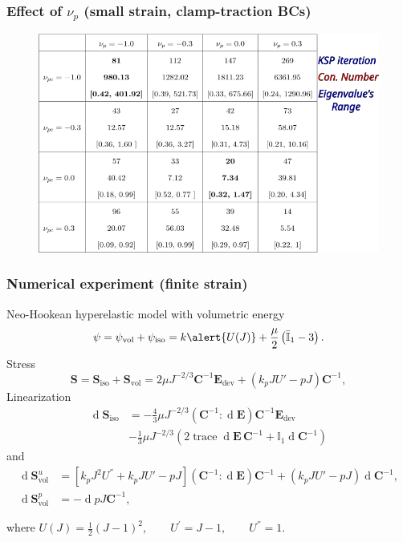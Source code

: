 \documentclass{beamer}
\newcommand{\bm}{\boldsymbol}
\newcommand\bS{\bm S}
\newcommand\bC{\bm C}
\newcommand\bE{\bm E}
\newcommand\bulk{k}
\newcommand\tcolon{\!:\!}
\newcommand\trace{\operatorname{trace}}
\newcommand\diff{\operatorname{d}\!}
\begin{document}
\begin{frame}
	\frametitle{Effect of $\nu_p$ (small strain, clamp-traction BCs)}
	\begin{figure} [h]
		\includegraphics[width=1\textwidth]{../figs/blockpc-mixed-linear-bending.png}
	\end{figure}
\end{frame}

\begin{frame}
	\frametitle{Numerical experiment (finite strain)}
	Neo-Hookean hyperelastic model with volumetric energy
	$$
		\psi = \psi_{\text{vol}} + \psi_{\text{iso}} = \bulk \alert{U(J)} + \frac{\mu}{2} \left( \bar{\mathbb{I}}_1 - 3 \right).
	$$
	Stress
	\begin{equation}\label{eq:S-mixed-NH}
		\bS = \bS_{\text{iso}} + \bS_{\text{vol}}= 2 \mu J^{-2/3} \bC^{-1} \bE_{\text{dev}} + \left(\bulk_p J U'- p J \right) \bm{C}^{-1}, \nonumber
	\end{equation}
	Linearization
	\begin{equation}\label{eq:S-iso-NH-linearization}
		\begin{split}
			\diff \bm{S}_\text{iso} &= -\frac{4}{3}\mu J^{-2/3} (\bm{C}^{-1} \tcolon \diff \bm{E}) \bm{C}^{-1} \bm{E}_\text{dev} \\ \nonumber
			&- \frac{1}{3} \mu J^{-2/3} \left( 2 \trace \diff \bm{E} \, \bm{C}^{-1} + \mathbb{I}_1 \diff \bm{C}^{-1} \right)
		\end{split}
	\end{equation}
	and
	\begin{equation}\label{eq:S-vol-linearization}
		\begin{split}
			\diff \bm{S}_{\text{vol}}^u 
			&= \left[\bulk_p J^2 U^{''} + \bulk_p J U' - p J \right] \left( \bm{C}^{-1} \tcolon \diff \bm{E} \right) \bm{C}^{-1} + \left(\bulk_p J U' - p J \right) \diff \bm{C}^{-1}, \\ \nonumber
			\diff \bm{S}_{\text{vol}}^p &= -\diff p J \bm{C}^{-1},
		\end{split}
	\end{equation}	

	where $	U(J) = \frac{1}{2} \left( J - 1 \right)^2, \qquad U^{'} = J - 1, \qquad U^{''} = 1.$
\end{frame}
\end{document}
